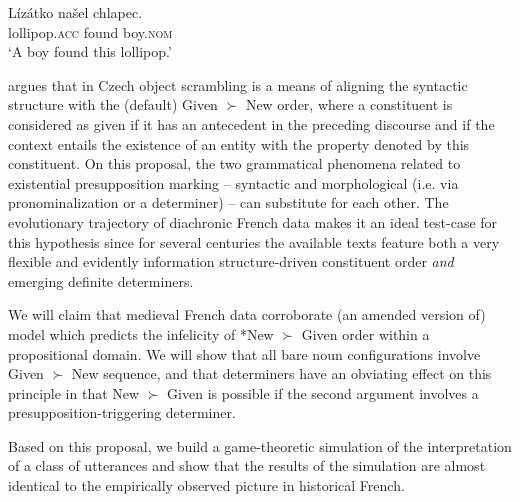 \documentclass[output=paper,modfonts,nonflat]{langsci/langscibook}
\begin{document}
\ea\label{ex:czech2}
\gll L\'{i}z\'{a}tko na\v{s}el chlapec.\\
lollipop.\textsc{acc} found boy.\textsc{nom} \\
\glt `A boy found this lollipop.'
\z




\citet{Kucerova:2012} argues that in Czech object scrambling is a means of aligning the syntactic structure with the (default) Given $\succ$ New order, where a constituent is considered as given if it has an antecedent in the preceding discourse and if the context entails the existence of an entity with the property denoted by this constituent. On this proposal, the two grammatical phenomena related to existential presupposition marking -- syntactic and morphological (i.e. via pronominalization or a determiner) -- can substitute for each other. The evolutionary trajectory of diachronic French data makes it an ideal test-case for this hypothesis since for several centuries the available texts feature both a very flexible and evidently information structure-driven constituent order {\itshape and} emerging definite determiners.

We will claim that medieval French data corroborate (an amended version of)  model which predicts the infelicity of *New $\succ$ Given order within a propositional domain. We will show that all bare noun configurations involve Given $\succ$ New sequence, and that determiners have an obviating effect on this principle in that New $\succ$ Given is possible if the second argument involves a presupposition-triggering determiner.

Based on this proposal, we build a game-theoretic simulation of the interpretation of a class of utterances and show that the results of the simulation are almost identical to the empirically observed picture in historical French.
\end{document}
